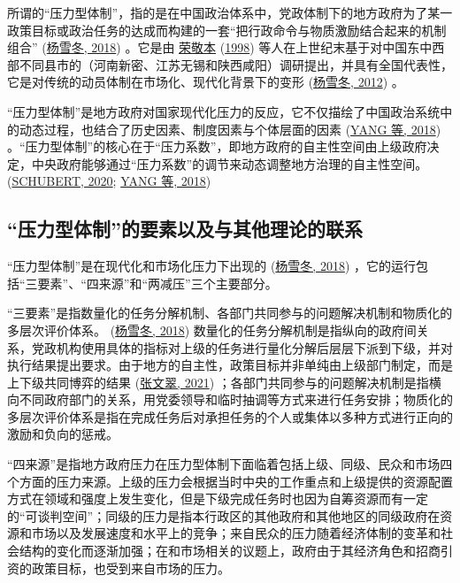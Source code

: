 \documentclass[
  12pt,
]{ctexart}
\begin{document}
所谓的``压力型体制''，指的是在中国政治体系中，党政体制下的地方政府为了某一政策目标或政治任务的达成而构建的一套``把行政命令与物质激励结合起来的机制组合'' (\protect\hyperlink{ref-YangXueDong2018}{杨雪冬, 2018}) 。它是由 \protect\hyperlink{ref-RongJingBen1998}{荣敬本} (\protect\hyperlink{ref-RongJingBen1998}{1998}) 等人在上世纪末基于对中国东中西部不同县市的（河南新密、江苏无锡和陕西咸阳）调研提出，并具有全国代表性，它是对传统的动员体制在市场化、现代化背景下的变形 (\protect\hyperlink{ref-YangXueDong2012}{杨雪冬, 2012}) 。

``压力型体制''是地方政府对国家现代化压力的反应，它不仅描绘了中国政治系统中的动态过程，也结合了历史因素、制度因素与个体层面的因素 (\protect\hyperlink{ref-YangYan2018}{YANG 等, 2018}) 。``压力型体制''的核心在于``压力系数''，即地方政府的自主性空间由上级政府决定，中央政府能够通过``压力系数''的调节来动态调整地方治理的自主性空间。 (\protect\hyperlink{ref-Schubert2020}{SCHUBERT, 2020}; \protect\hyperlink{ref-YangYan2018}{YANG 等, 2018})

\hypertarget{ux538bux529bux578bux4f53ux5236ux7684ux8981ux7d20ux4ee5ux53caux4e0eux5176ux4ed6ux7406ux8bbaux7684ux8054ux7cfb}{%
\subsection{``压力型体制''的要素以及与其他理论的联系}\label{ux538bux529bux578bux4f53ux5236ux7684ux8981ux7d20ux4ee5ux53caux4e0eux5176ux4ed6ux7406ux8bbaux7684ux8054ux7cfb}}

``压力型体制''是在现代化和市场化压力下出现的 (\protect\hyperlink{ref-YangXueDong2018}{杨雪冬, 2018}) ，它的运行包括``三要素''、``四来源''和``两减压''三个主要部分。

``三要素''是指数量化的任务分解机制、各部门共同参与的问题解决机制和物质化的多层次评价体系。 (\protect\hyperlink{ref-YangXueDong2018}{杨雪冬, 2018}) 数量化的任务分解机制是指纵向的政府间关系，党政机构使用具体的指标对上级的任务进行量化分解后层层下派到下级，并对执行结果提出要求。由于地方的自主性，政策目标并非单纯由上级部门制定，而是上下级共同博弈的结果 (\protect\hyperlink{ref-ZhangWenCui2021}{张文翠, 2021}) ；各部门共同参与的问题解决机制是指横向不同政府部门的关系，用党委领导和临时抽调等方式来进行任务安排；物质化的多层次评价体系是指在完成任务后对承担任务的个人或集体以多种方式进行正向的激励和负向的惩戒。

``四来源''是指地方政府压力在压力型体制下面临着包括上级、同级、民众和市场四个方面的压力来源。上级的压力会根据当时中央的工作重点和上级提供的资源配置方式在领域和强度上发生变化，但是下级完成任务时也因为自筹资源而有一定的``可谈判空间''；同级的压力是指本行政区的其他政府和其他地区的同级政府在资源和市场以及发展速度和水平上的竞争；来自民众的压力随着经济体制的变革和社会结构的变化而逐渐加强；在和市场相关的议题上，政府由于其经济角色和招商引资的政策目标，也受到来自市场的压力。
\end{document}
